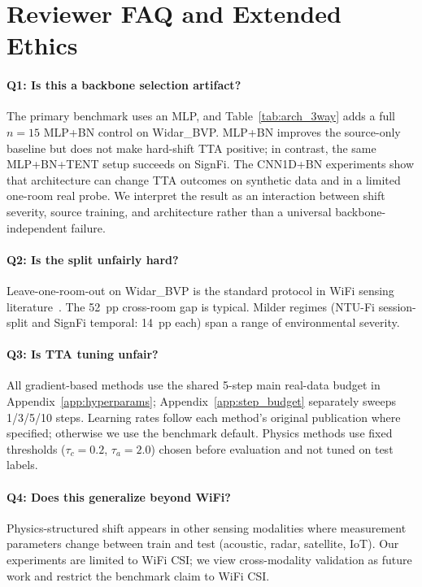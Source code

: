 \section{Reviewer FAQ and Extended Ethics}
\label{app:reviewer_faq}

\paragraph{Q1: Is this a backbone selection artifact?}
The primary benchmark uses an MLP, and Table~\ref{tab:arch_3way} adds a full $n{=}15$ MLP+BN control on Widar\_BVP. MLP+BN improves the source-only baseline but does not make hard-shift TTA positive; in contrast, the same MLP+BN+TENT setup succeeds on SignFi. The CNN1D+BN experiments show that architecture can change TTA outcomes on synthetic data and in a limited one-room real probe. We interpret the result as an interaction between shift severity, source training, and architecture rather than a universal backbone-independent failure.

\paragraph{Q2: Is the split unfairly hard?}
Leave-one-room-out on Widar\_BVP is the standard protocol in WiFi sensing literature~\cite{zheng2019widar,yousefi2017uthar}. The 52~pp cross-room gap is typical. Milder regimes (NTU-Fi session-split and SignFi temporal: 14~pp each) span a range of environmental severity.

\paragraph{Q3: Is TTA tuning unfair?}
All gradient-based methods use the shared 5-step main real-data budget in Appendix~\ref{app:hyperparams}; Appendix~\ref{app:step_budget} separately sweeps 1/3/5/10 steps. Learning rates follow each method's original publication where specified; otherwise we use the benchmark default. Physics methods use fixed thresholds ($\tau_c=0.2$, $\tau_a=2.0$) chosen before evaluation and not tuned on test labels.

\paragraph{Q4: Does this generalize beyond WiFi?}
Physics-structured shift appears in other sensing modalities where measurement parameters change between train and test (acoustic, radar, satellite, IoT). Our experiments are limited to WiFi CSI; we view cross-modality validation as future work and restrict the benchmark claim to WiFi CSI.

